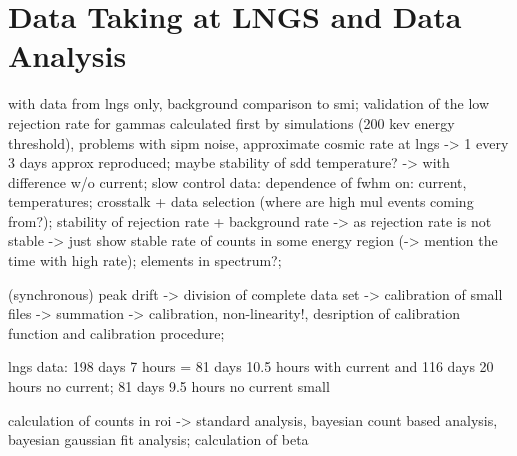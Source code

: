 \chapter{Data Taking at LNGS and Data Analysis}
\label{chap:DataAnalysis}

with data from lngs only, background comparison to smi; validation of the low rejection rate for gammas calculated first by simulations (200 kev energy threshold), problems with sipm noise, approximate cosmic rate at lngs -> 1 every 3 days approx reproduced; maybe stability of sdd temperature? -> with difference w/o current; slow control data: dependence of fwhm on: current, temperatures; crosstalk + data selection (where are high mul events coming from?); stability of rejection rate + background rate -> as rejection rate is not stable -> just show stable rate of counts in some energy region (-> mention the time with high rate); elements in spectrum?; 

(synchronous) peak drift -> division of complete data set -> calibration of small files -> summation -> calibration, non-linearity!, desription of calibration function and calibration procedure;

lngs data: 198 days 7 hours =  81 days 10.5 hours with current and 116 days 20 hours no current; 81 days 9.5 hours no current small

calculation of counts in roi -> standard analysis, bayesian count based analysis, bayesian gaussian fit analysis; calculation of beta

